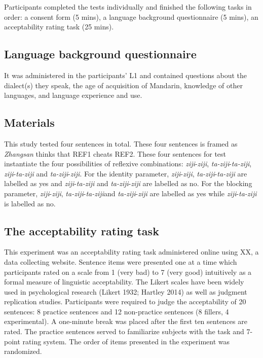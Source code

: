 \documentclass[
  english,
  man,floatsintext]{apa6}
\begin{document}
Participants completed the tests individually and finished the following tasks in order: a consent form (5 mins), a language background questionnaire (5 mins), an acceptability rating task (25 mins).

\hypertarget{language-background-questionnaire}{%
\subsection{Language background questionnaire}\label{language-background-questionnaire}}

It was administered in the participants' L1 and contained questions about the dialect(s) they speak, the age of acquisition of Mandarin, knowledge of other languages, and language experience and use.

\hypertarget{materials}{%
\subsection{Materials}\label{materials}}

This study tested four sentences in total. These four sentences is framed as \emph{Zhangsan} thinks that REF1 cheats REF2. These four sentences for test instantiate the four possibilities of reflexive combinations: \emph{ziji}-\emph{ziji}, \emph{ta-ziji}-\emph{ta-ziji}, \emph{ziji}-\emph{ta-ziji} and \emph{ta-ziji}-\emph{ziji}. For the identity parameter, \emph{ziji}-\emph{ziji}, \emph{ta-ziji}-\emph{ta-ziji} are labelled as yes and \emph{ziji}-\emph{ta-ziji} and \emph{ta-ziji}-\emph{ziji} are labelled as no. For the blocking parameter, \emph{ziji}-\emph{ziji}, \emph{ta-ziji}-\emph{ta-ziji}and \emph{ta-ziji}-\emph{ziji} are labelled as yes while \emph{ziji}-\emph{ta-ziji} is labelled as no.

\hypertarget{the-acceptability-rating-task}{%
\subsection{The acceptability rating task}\label{the-acceptability-rating-task}}

This experiment was an acceptability rating task administered online using XX, a data collecting website. Sentence items were presented one at a time which participants rated on a scale from 1 (very bad) to 7 (very good) intuitively as a formal measure
of linguistic acceptability. The Likert scales have been widely used in psychological research (Likert 1932; Hartley 2014) as well as judgment replication studies. Participants were required to judge the acceptability of 20 sentences: 8 practice sentences and 12 non-practice sentences (8 fillers, 4 experimental). A one-minute break was placed after the first ten sentences are rated. The practice sentences served to familiarize subjects with the task and 7-point rating system. The order of items presented in the experiment was randomized.
\end{document}
